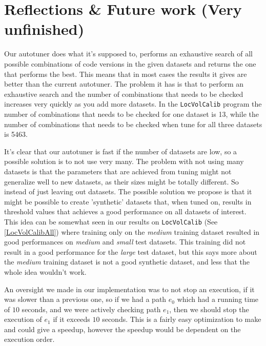 \section{Reflections \& Future work (Very unfinished)}
\label{synData}
Our autotuner does what it's supposed to, performs an exhaustive search of all
possible combinations of code versions in the given datasets and returns the
one that performs the best. This means that in most cases the results it gives
are better than the current autotuner. The problem it has is that to perform an
exhaustive search and the number of combinations that needs to be checked increases
very quickly as you add more datasets. In the \texttt{LocVolCalib} program the
number of combinations that needs to be checked for one dataset is 13, while
the number of combinations that needs to be checked when tune for all
three datasets is 5463. 

It's clear that our autotuner is fast if the number of datasets are low, so a
possible solution is to not use very many. The problem with not using many
datasets is that the parameters that are achieved from tuning might not
generalize well to new datasets, as their sizes might be totally different. So
instead of just leaving out datasets. The possible solution we propose is that
it might be possible to create 'synthetic' datasets that, when tuned on,
results in threshold values that achieves a good performance on all datasets of
interest. 
This idea can be somewhat seen in our results on \texttt{LocVolCalib} (See \ref{LocVolCalibAll})
where training only on the \textit{medium} training  dataset resulted in good
performances on \textit{medium} and \textit{small} test datasets. This training
did not result in a good performance for the \textit{large} test dataset, but
this says more about the \textit{medium} training dataset is not a good
synthetic dataset, and less that the whole idea wouldn't work.

An oversight we made in our implementation was to not stop an execution, if it was slower than a previous one, so if we had a path $e_0$ which had a running time of $10$ seconds, and we were actively checking path $e_1$, then we should stop the execution of $e_1$ if it exceeds $10$ seconds. This is a fairly easy optimization to make and could give a speedup, however the speedup would be dependent on the execution order. 
